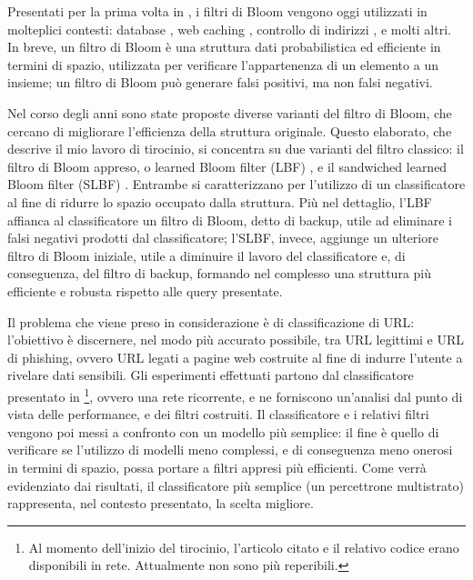 \documentclass[../../main.tex]{subfiles}
\begin{document}
    
    Presentati per la prima volta in \cite{Bloom1970SpacetimeTI}, i filtri di Bloom vengono oggi utilizzati in molteplici contesti: database \cite{kraska2018case}, web caching \cite{Maggs15algorithmicnuggets}, controllo di indirizzi \cite{Dharmapurikar2006LongestPM}, e molti altri. In breve, un filtro di Bloom è una struttura dati probabilistica ed efficiente in termini di spazio, utilizzata per verificare l'appartenenza di un elemento a un insieme; un filtro di Bloom può generare falsi positivi, ma non falsi negativi.

    Nel corso degli anni sono state proposte diverse varianti del filtro di Bloom, che cercano di migliorare l'efficienza della struttura originale. Questo elaborato, che descrive il mio lavoro di tirocinio, si concentra su due varianti del filtro classico: il filtro di Bloom appreso, o learned Bloom filter (LBF) \cite{kraska2018case}, e il sandwiched learned Bloom filter (SLBF) \cite{10.5555/3326943.3326986}. Entrambe si caratterizzano per l'utilizzo di un classificatore al fine di ridurre lo spazio occupato dalla struttura. Più nel dettaglio, l'LBF affianca al classificatore un filtro di Bloom, detto di backup, utile ad eliminare i falsi negativi prodotti dal classificatore; l'SLBF, invece, aggiunge un ulteriore filtro di Bloom iniziale, utile a diminuire il lavoro del classificatore e, di conseguenza, del filtro di backup, formando nel complesso una struttura più efficiente e robusta rispetto alle query presentate.

    Il problema che viene preso in considerazione è di classificazione di URL: l'obiettivo è discernere, nel modo più accurato possibile, tra URL legittimi e URL di phishing, ovvero URL legati a pagine web costruite al fine di indurre l'utente a rivelare dati sensibili. Gli esperimenti effettuati partono dal classificatore presentato in \cite{ma2020}\footnote{Al momento dell'inizio del tirocinio, l'articolo citato e il relativo codice erano disponibili in rete. Attualmente non sono più reperibili.}, ovvero una rete ricorrente, e ne forniscono un'analisi dal punto di vista delle performance, e dei filtri costruiti. Il classificatore e i relativi filtri vengono poi messi a confronto con un modello più semplice: il fine è quello di verificare se l'utilizzo di modelli meno complessi, e di conseguenza meno onerosi in termini di spazio, possa portare a filtri appresi più efficienti. Come verrà evidenziato dai risultati, il classificatore più semplice (un percettrone multistrato) rappresenta, nel contesto presentato, la scelta migliore.
\end{document}
